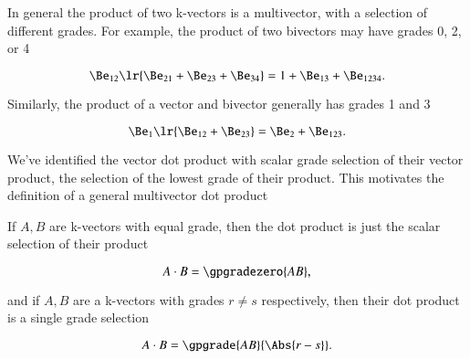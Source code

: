 %
%

In general the product of two k-vectors is a multivector, with a selection of different grades.
For example, the product of two bivectors may have grades 0, 2, or 4

\begin{dmath}\label{eqn:generalizedDot:601}
\Be_{12} \lr{ \Be_{21} + \Be_{23} + \Be_{34} }
=
1 + \Be_{13} + \Be_{1234}.
\end{dmath}

Similarly,
the product of a vector and bivector generally has grades 1 and 3

\begin{dmath}\label{eqn:generalizedDot:621}
\Be_1 \lr{ \Be_{12} + \Be_{23} }
=
\Be_2 + \Be_{123}.
\end{dmath}

We've identified the vector dot product with scalar grade selection of their vector product, the selection of the lowest grade of their product.
This motivates the definition of a general multivector dot product


If \( A, B \) are k-vectors with equal grade, then the dot product is just the scalar selection of their product

\begin{dmath}\label{eqn:generalizedDot:580}
A \cdot B = \gpgradezero{ A B },
\end{dmath}

and if \( A, B \) are a k-vectors with grades \( r \ne s \) respectively, then their dot product is a single grade selection

\begin{dmath}\label{eqn:generalizedDot:581}
A \cdot B = \gpgrade{ A B }{\Abs{r - s}}.
\end{dmath}

